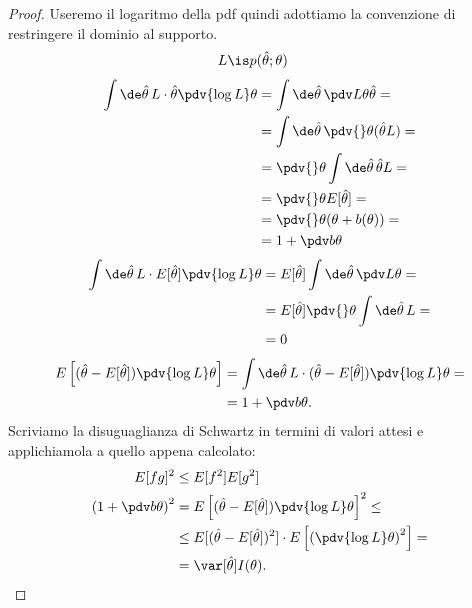 \begin{proof}
	Useremo il logaritmo della pdf quindi adottiamo la convenzione di restringere il dominio al supporto.
	\begin{align*}
		L &\is p(\hat\theta;\theta)
	\end{align*}
	\begin{align*}
		\int \de\hat\theta\,
		L \cdot \hat\theta \pdv{\log L}\theta 
		&= \int \de\hat\theta\,
		\pdv L\theta \hat\theta = \\
		&= \int \de\hat\theta\,
		\pdv{}\theta (\hat\theta L) = \\
		&= \pdv{}\theta \int \de\hat\theta\, \hat\theta L = \\
		&= \pdv{}\theta E[\hat\theta] = \\
		&= \pdv{}\theta (\theta + b(\theta)) = \\
		&= 1 + \pdv b\theta
	\end{align*}
	\begin{align*}
		\int \de\hat\theta\,
		L \cdot E[\hat\theta] \pdv{\log L}\theta
		&= E[\hat\theta] \int \de\hat\theta\, \pdv L\theta = \\
		&= E[\hat\theta] \pdv{}\theta \int \de\hat\theta\, L = \\
		&= 0
	\end{align*}
	\begin{align*}
		E \left[ (\hat\theta - E[\hat\theta]) \pdv{\log L}\theta \right]
		&= \int \de\hat\theta\, L \cdot
		(\hat\theta - E[\hat\theta]) \pdv{\log L}\theta = \\
		&= 1 + \pdv b\theta.
	\end{align*}
	Scriviamo la disuguaglianza di Schwartz in termini di valori attesi
	e applichiamola a quello appena calcolato:
	\begin{align*}
		E[fg]^2 &\le E[f^2]E[g^2] \\
		\left( 1 + \pdv b\theta \right)^2
		&= E \left[ (\hat\theta - E[\hat\theta]) \pdv{\log L}\theta \right]^2 \le \\
		&\le E[(\hat\theta - E[\hat\theta])^2]
		\cdot E \left[ \left( \pdv{\log L}\theta \right)^2 \right] = \\
		&= \var[\hat\theta] I(\theta). \qedhere
	\end{align*}
\end{proof}
